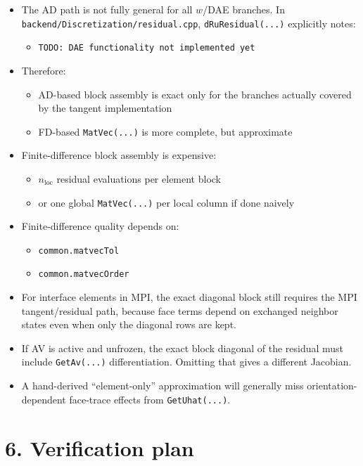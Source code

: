 \documentclass[11pt]{article}
\begin{document}
\begin{itemize}[leftmargin=*]
\item The AD path is not fully general for all $w$/DAE branches. In
\texttt{backend/Discretization/residual.cpp}, \texttt{dRuResidual(...)}
explicitly notes:
\begin{itemize}[leftmargin=*]
\item \texttt{TODO: DAE functionality not implemented yet}
\end{itemize}
\item Therefore:
\begin{itemize}[leftmargin=*]
\item AD-based block assembly is exact only for the branches actually covered
by the tangent implementation
\item FD-based \texttt{MatVec(...)} is more complete, but approximate
\end{itemize}
\item Finite-difference block assembly is expensive:
\begin{itemize}[leftmargin=*]
\item $n_{\mathrm{loc}}$ residual evaluations per element block
\item or one global \texttt{MatVec(...)} per local column if done naively
\end{itemize}
\item Finite-difference quality depends on:
\begin{itemize}[leftmargin=*]
\item \texttt{common.matvecTol}
\item \texttt{common.matvecOrder}
\end{itemize}
\item For interface elements in MPI, the exact diagonal block still requires
the MPI tangent/residual path, because face terms depend on exchanged neighbor
states even when only the diagonal rows are kept.
\item If AV is active and unfrozen, the exact block diagonal of the residual
must include \texttt{GetAv(...)} differentiation. Omitting that gives a
different Jacobian.
\item A hand-derived ``element-only'' approximation will generally miss
orientation-dependent face-trace effects from \texttt{GetUhat(...)}.
\end{itemize}

\section*{6. Verification plan}
\end{document}
